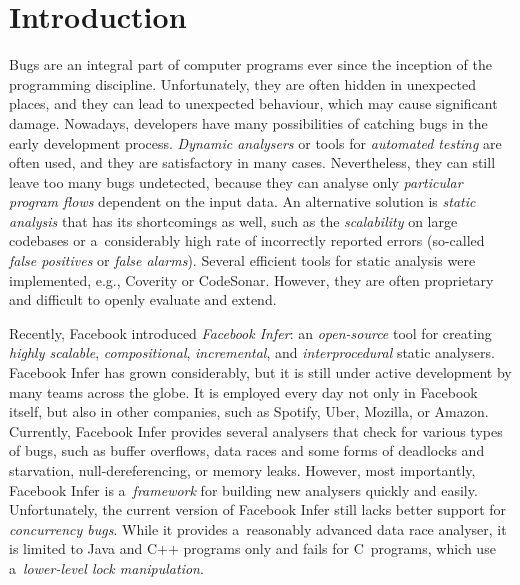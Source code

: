 




\chapter{Introduction}

Bugs are an integral part of computer programs ever since the inception of the programming discipline. Unfortunately, they are often hidden in unexpected places, and they can lead to unexpected behaviour, which may cause significant damage. Nowadays, developers have many possibilities of catching bugs in the early development process. \emph{Dynamic analysers} or tools for \emph{automated testing} are often used, and they are satisfactory in many cases. Nevertheless, they can still leave too many bugs undetected, because they can analyse only \emph{particular program flows} dependent on the input data. An alternative solution is \emph{static analysis} that has its shortcomings as well, such as the \emph{scalability} on large codebases or a~considerably high rate of incorrectly reported errors (so-called \emph{false positives} or \emph{false alarms}). Several efficient tools for static analysis were implemented, e.g., Coverity or CodeSonar. However, they are often proprietary and difficult to openly evaluate and extend.

Recently, Facebook introduced \emph{Facebook Infer}: an \emph{open-source} tool for creating \emph{highly scalable}, \emph{compositional}, \emph{incremental}, and \emph{interprocedural} static analysers. Facebook Infer has grown considerably, but it is still under active development by many teams across the globe. It is employed every day not only in Facebook itself, but also in other companies, such as Spotify, Uber, Mozilla, or Amazon. Currently, Facebook Infer provides several analysers that check for various types of bugs, such as buffer overflows, data races and some forms of deadlocks and starvation, null-dereferencing, or memory leaks. However, most importantly, Facebook Infer is a~\emph{framework} for building new analysers quickly and easily. Unfortunately, the current version of Facebook Infer still lacks better support for \emph{concurrency bugs}. While it provides a~reasonably advanced data race analyser, it is limited to Java and C++ programs only and fails for C~programs, which use a~\emph{lower-level lock manipulation}.

